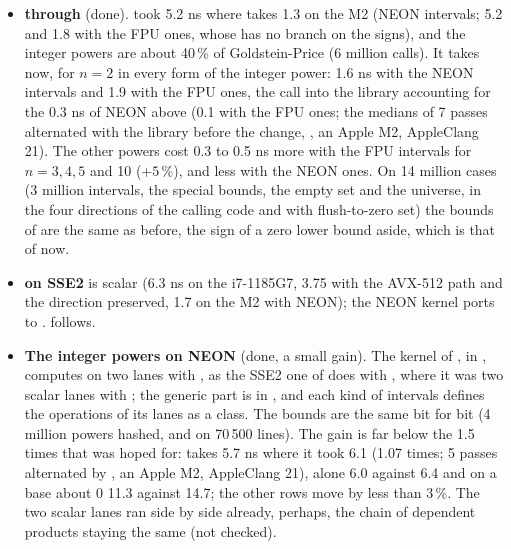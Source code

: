 \documentclass[12pt,a4paper,twoside,openright]{book}
\begin{document}
\begin{itemize}
\item[$\bullet$] \textbf{ through } (done).
 took 5.2 ns where  takes 1.3 on the M2 (NEON
intervals; 5.2 and 1.8 with the FPU ones, whose  has no branch on
the signs), and the integer powers are about 40\,\% of Goldstein-Price (6
million calls). It takes  now, for $n = 2$ in every form of the
integer power:\newinvfive{} 1.6 ns with the NEON intervals and 1.9 with the
FPU ones, the call into the library accounting for the 0.3 ns of NEON above
 (0.1 with the FPU ones; the medians of 7 passes alternated with
the library before the change, , an Apple M2,
AppleClang 21). The other powers cost 0.3 to 0.5 ns more with the FPU
intervals for $n = 3, 4, 5$ and 10 ($+5\,\%$), and less with the NEON ones.
On 14 million cases (3 million intervals, the special bounds, the empty set
and the universe, in the four directions of the calling code and with
flush-to-zero set) the bounds of  are the same as before,
the sign of a zero lower bound aside, which is that of  now.
\item[$\bullet$] \textbf{ on SSE2} is scalar (6.3 ns on the
i7-1185G7, 3.75 with the AVX-512 path and the direction preserved, 1.7 on
the M2 with NEON); the NEON kernel ports to .
 follows.
\item[$\bullet$] \textbf{The integer powers on NEON} (done, a small gain).
The kernel of , in ,
computes on two lanes with , as the SSE2 one of
 does with , where it was
two scalar lanes with ; the generic part is in
, and each kind of intervals defines the
operations of its lanes as a class.\newinvfive{} The bounds are the same bit
for bit (4 million powers hashed, and  on
70\,500 lines). The gain is far below the 1.5 times that was hoped for:
 takes 5.7 ns where it took 6.1 (1.07 times; 5 passes
alternated by , an Apple M2,
AppleClang 21),  alone 6.0 against 6.4 and
 on a base about 0 11.3 against 14.7; the
other rows move by less than 3\,\%. The two scalar lanes ran side by side
already, perhaps, the chain of dependent products staying the same (not
checked).

\end{itemize}
\end{document}
